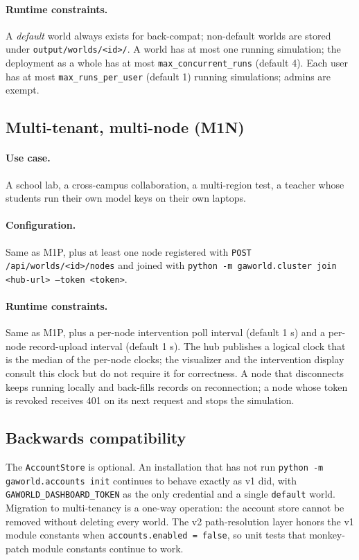 \paragraph{Runtime constraints.}
A \emph{default} world always exists for back-compat; non-default
worlds are stored under \texttt{output/worlds/<id>/}.  A world has
at most one running simulation; the deployment as a whole has at
most \texttt{max\_concurrent\_runs} (default 4).  Each user has at
most \texttt{max\_runs\_per\_user} (default 1) running simulations;
admins are exempt.

\subsection{Multi-tenant, multi-node (M1N)}

\paragraph{Use case.}  A school lab, a cross-campus collaboration, a
multi-region test, a teacher whose students run their own model keys
on their own laptops.

\paragraph{Configuration.}
Same as M1P, plus at least one node registered with
\texttt{POST /api/worlds/<id>/nodes} and joined with
\texttt{python -m gaworld.cluster join <hub-url> --token <token>}.

\paragraph{Runtime constraints.}
Same as M1P, plus a per-node intervention poll interval (default 1 s)
and a per-node record-upload interval (default 1 s).  The hub
publishes a logical clock that is the median of the per-node clocks;
the visualizer and the intervention display consult this clock but
do not require it for correctness.  A node that disconnects keeps
running locally and back-fills records on reconnection; a node
whose token is revoked receives 401 on its next request and stops
the simulation.

\subsection{Backwards compatibility}

The \texttt{AccountStore} is optional.  An installation that has not
run \texttt{python -m gaworld.accounts init} continues to behave
exactly as v1 did, with \texttt{GAWORLD\_DASHBOARD\_TOKEN} as the only
credential and a single \texttt{default} world.  Migration to
multi-tenancy is a one-way operation: the account store cannot be
removed without deleting every world.  The v2 path-resolution layer
honors the v1 module constants when \texttt{accounts.enabled = false},
so unit tests that monkey-patch module constants continue to work.


